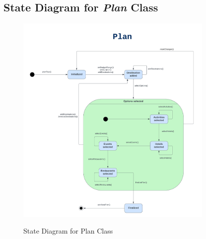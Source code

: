 \documentclass[12pt]{article}
\begin{document}
\subsection{State Diagram for \emph{Plan} Class}
\begin{figure}[H]
    \centering
        \includegraphics[width=0.85\textwidth]{State Diagram/plan2.png}
        \label{fig:StatePlan}
    \caption{State Diagram for Plan Class}
\end{figure}

\newpage
\end{document}
